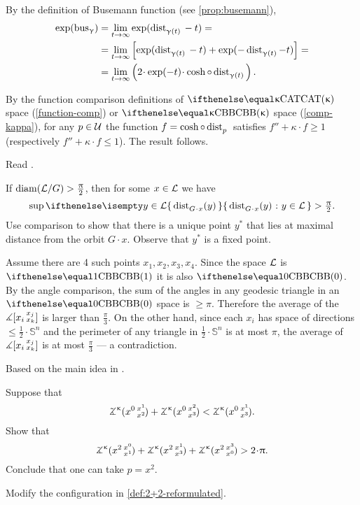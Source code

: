 By the definition of Busemann function (see  \ref{prop:busemann}),
\begin{align*}
\exp(\bus_\gamma) 
&=  \lim_{t\to \infty} \exp(\distfun{{\gamma (t)}}{}{} - t)=
\\
&= \lim_{t\to \infty} \left[\exp (\distfun{\gamma (t)}{}{} -t)
+\exp(-\distfun{\gamma (t)}-t)\right]=
\\
&=  \lim_{t\to \infty} \left(2\cdot \exp(-t)\cdot \cosh \circ\distfun{\gamma (t)}{}{}\right).
\end{align*}

By the function comparison definitions of $\CAT\kappa$ space (\ref{function-comp}) or $\Alex{\kappa}$ space (\ref{comp-kappa}),  for any $p\in \spc{U}$ the function $f=\cosh \circ\distfun{p}{}{}$ satisfies $f''+\kappa \cdot f\ge 1$ (respectively  $f''+\kappa \cdot f\le 1$).
The result follows.

Read \cite{petrunin:globalization}.

 If $\mathop{\rm diam}\nolimits(\mathcal{L}/G)>\tfrac{\uppi}2$, then for some $x\in \spc{L}$ we have
\[\sup \set{\distfun{G\cdot x}(y)}{y\in \spc{L}}
>
\tfrac\pi2.\]
Use comparison to show that there is a unique point $y^{*}$ that lies at maximal distance from the orbit $G\cdot x$.
Observe that $y^{*}$ is a fixed point.

Assume there are 4 such points $x_1,x_2,x_3,x_4$.
Since the space $\mathcal{L}$ is $\Alex{1}$ it is also $\Alex{0}$.
By the angle comparison, the sum of the angles in any geodesic triangle in an $\Alex{0}$ space is $\ge \pi$.
Therefore the average of the $\measuredangle[x_i\,{}^{x_j}_{x_k}]$ is  larger than $\tfrac\pi3$.
On the other hand, since each $x_i$ has space of directions $\le\tfrac12\cdot\mathbb{S}^n$ and the perimeter of any triangle in $\tfrac12\cdot\mathbb{S}^n$ is at most $\pi$, the average of $\measuredangle[x_i\,{}^{x_j}_{x_k}]$ is at most $\tfrac\pi3$ --- a contradiction.

 Based on the main idea in \cite{hsiang-kleiner}.

Suppose that 
\[\angk\kappa {x^0}{x^1}{x^2}+\angk\kappa {x^0}{x^2}{x^3}<\angk\kappa {x^0}{x^1}{x^3}.\]
Show that
\[\angk\kappa {x^2}{x^0}{x^1}+\angk\kappa {x^2}{x^1}{x^3}+\angk\kappa {x^2}{x^3}{x^0}>2\cdot\pi.\]
Conclude that one can take $p=x^2$.

Modify the configuration in \ref{def:2+2-reformulated}.


